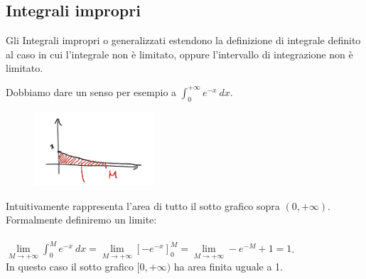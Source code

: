 \subsection{Integrali impropri}
Gli Integrali impropri o generalizzati estendono la definizione di integrale definito al caso in cui l'integrale non è limitato, oppure l'intervallo di integrazione non è limitato.
\begin{example}
Dobbiamo dare un senso per esempio a $\int_0^{+\infty}e^{-x}\:dx$.
\end{example}
\begin{figure}
    \vspace{-25pt}
    \centering
    \includegraphics[width=4.5cm]{images/esempio-integrale-improprio-1.png}
\end{figure}
Intuitivamente rappresenta l'area di tutto il sotto grafico sopra $(0,+\infty)$.
Formalmente definiremo un limite: \\\\
$\lim\limits_{M\to +\infty}\int_0^Me^{-x}\:dx = \lim\limits_{M\to + \infty}[-e^{-x}]^M_0=\lim\limits_{M\to +\infty}-e^{-M}+1 = 1$.\\
In questo caso il sotto grafico $[0,+\infty)$ ha area finita uguale a 1.

